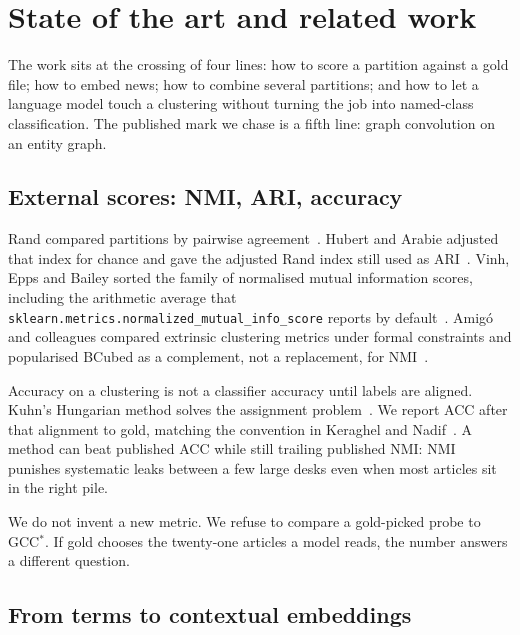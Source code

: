 \documentclass[11pt,a4paper]{article}
\begin{document}
\section{State of the art and related work}

The work sits at the crossing of four lines: how to score a
partition against a gold file; how to embed news; how to combine
several partitions; and how to let a language model touch a
clustering without turning the job into named-class
classification. The published mark we chase is a fifth line:
graph convolution on an entity graph.

\subsection{External scores: NMI, ARI, accuracy}

Rand compared partitions by pairwise agreement~\cite{rand1971}.
Hubert and Arabie adjusted that index for chance and gave the
adjusted Rand index still used as ARI~\cite{hubert1985ari}.
Vinh, Epps and Bailey sorted the family of normalised mutual
information scores, including the arithmetic average that
\texttt{sklearn.metrics.normalized\_mutual\_info\_score} reports
by default~\cite{vinh2010nmi,pedregosa2011sklearn}. Amig\'{o} and
colleagues compared extrinsic clustering metrics under formal
constraints and popularised BCubed as a complement, not a
replacement, for NMI~\cite{amigo2009bcubed}.

Accuracy on a clustering is not a classifier accuracy until labels
are aligned. Kuhn's Hungarian method solves the assignment
problem~\cite{kuhn1955hungarian}. We report ACC after that
alignment to gold, matching the convention in Keraghel and
Nadif~\cite{keraghel2024gcc}. A method can beat published ACC
while still trailing published NMI: NMI punishes systematic leaks
between a few large desks even when most articles sit in the
right pile.

We do not invent a new metric. We refuse to compare a gold-picked
probe to GCC$^*$. If gold chooses the twenty-one articles a model
reads, the number answers a different question.

\subsection{From terms to contextual embeddings}
\end{document}
